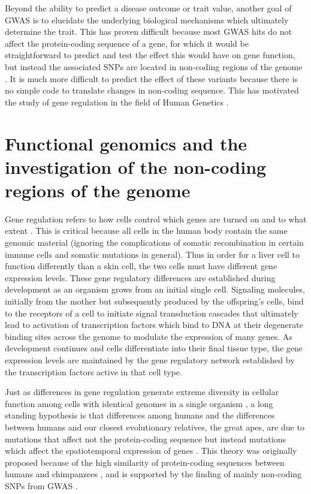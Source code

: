 Beyond the ability to predict a disease outcome or trait value,
another goal of GWAS is to elucidate the underlying biological
mechanisms which ultimately determine the trait. This has proven
difficult because most GWAS hits do not affect the protein-coding
sequence of a gene, for which it would be straightforward to predict
and test the effect this would have on gene function, but instead the
associated SNPs are located in non-coding regions of the genome
\citep{Hindorff2009, Manolio2009}. It is much more difficult to
predict the effect of these variants because there is no simple code
to translate changes in non-coding sequence. This has motivated the
study of gene regulation in the field of Human Genetics
\citep{Lappalainen2010, Trynka2013, Civelek2014, Lappalainen2015}.

\section{Functional genomics and the investigation of the non-coding regions of the genome}

Gene regulation refers to how cells control which genes are turned on
and to what extent \citep{Davidson2010, Natoli2010, Strachan2011,
  Ostuni2013, Tsankov2015}. This is critical because all cells in the
human body contain the same genomic material (ignoring the
complications of somatic recombination in certain immune cells and
somatic mutations in general). Thus in order for a liver cell to
function differently than a skin cell, the two cells must have
different gene expression levels. These gene regulatory differences
are established during development as an organism grows from an
initial single cell. Signaling molecules, initially from the mother
but subsequently produced by the offspring's cells, bind to the
receptors of a cell to initiate signal transduction cascades that
ultimately lead to activation of transcription factors which bind to
DNA at their degenerate binding sites across the genome to modulate
the expression of many genes. As development continues and cells
differentiate into their final tissue type, the gene expression levels
are maintained by the gene regulatory network established by the
transcription factors active in that cell type.

Just as differences in gene regulation generate extreme diversity in
cellular function among cells with identical genomes in a single
organism \citep{Natoli2010}, a long standing hypothesis is that
differences among humans and the differences between humans and our
closest evolutionary relatives, the great apes, are due to mutations
that affect not the protein-coding sequence but instead mutations
which affect the spatiotemporal expression of genes
\citep{Britten1969, King1975, Carroll2008}. This theory was originally
proposed because of the high similarity of protein-coding sequences
between humans and chimpanzees \citep{King1975}, and is supported by
the finding of mainly non-coding SNPs from GWAS \citep{Welter2014}.

